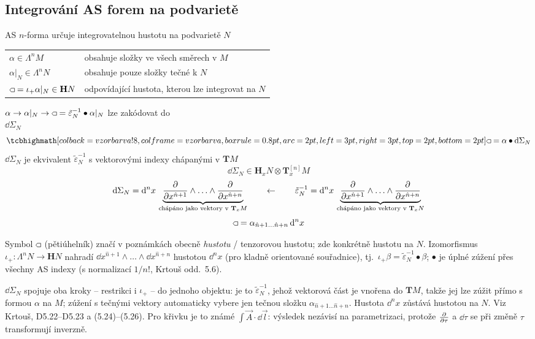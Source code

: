 \subsection{Integrování AS forem na podvarietě}

AS $n$-forma určuje integrovatelnou hustotu na podvarietě $N$

\begin{tabular}{@{}ll}
$\alpha\in\Lambda^nM$ & obsahuje složky ve všech směrech v $M$ \\
$\alpha|_N\in\Lambda^nN$ & obsahuje pouze složky tečné k $N$ \\
$\gmIpatnactHust = \iota_+\alpha|_N\in\mathbf{H}N$ & odpovídající hustota, kterou lze integrovat na $N$
\end{tabular}

\quad $\alpha\to\alpha|_N\to\gmIpatnactHust = \tilde\varepsilon_N^{-1}\bullet\alpha|_N$ \quad
lze zakódovat do \\
\hspace*{5.6cm}  $\dd\Sigma_N$
\[
  \vzorec{\gmIpatnactHust = \alpha\bullet\dd\Sigma_N}
\]
\quad $\dd\Sigma_N$ je ekvivalent $\tilde\varepsilon_N^{-1}$ s vektorovými indexy chápanými v $\mathbf{T}M$
\[
  \dd\Sigma_N\in\mathbf{H}_xN\otimes\mathbf{T}^{[n]}_xM
\]
\[
  \dd\Sigma_N = \dd^n x\,\underbrace{\pdv{x^{\hat n+1}}\wedge\ldots\wedge\pdv{x^{\hat n+n}}}_{\text{chápáno jako vektory v }\mathbf{T}_xM}
  \qquad\leftarrow\qquad
  \tilde\varepsilon_N^{-1} = \dd^n x\,\underbrace{\pdv{x^{\hat n+1}}\wedge\ldots\wedge\pdv{x^{\hat n+n}}}_{\text{chápáno jako vektory v }\mathbf{T}_xN}
\]
\[
  \gmIpatnactHust = \alpha_{\hat n+1\ldots\hat n+n}\,\dd^n x
\]

\begin{vysvetleni}
Symbol $\gmIpatnactHust$ (pětiúhelník) značí v poznámkách obecně \emph{hustotu} / tenzorovou hustotu; zde konkrétně hustotu na $N$. Izomorfismus $\iota_+:\Lambda^nN\to\mathbf HN$ nahradí $\dd x^{\hat n+1}\wedge\ldots\wedge\dd x^{\hat n+n}$ hustotou $\dd^nx$ (pro kladně orientované souřadnice), tj.\ $\iota_+\beta=\tilde\varepsilon_N^{-1}\bullet\beta$; $\bullet$ je úplné zúžení přes všechny AS indexy (s normalizací $1/n!$, Krtouš odd.~5.6).

$\dd\Sigma_N$ spojuje oba kroky -- restrikci i $\iota_+$ -- do jednoho objektu: je to $\tilde\varepsilon_N^{-1}$, jehož vektorová část je vnořena do $\mathbf T M$, takže jej lze zúžit přímo s formou $\alpha$ na $M$; zúžení s tečnými vektory automaticky vybere jen tečnou složku $\alpha_{\hat n+1\ldots\hat n+n}$. Hustota $\dd^nx$ zůstává hustotou na $N$. Viz Krtouš, D5.22--D5.23 a (5.24)--(5.26). Pro křivku je to známé $\int\vec A\cdot\dd\vec l$: výsledek nezávisí na parametrizaci, protože $\pdv{\tau}$ a $\dd\tau$ se při změně $\tau$ transformují inverzně.
\end{vysvetleni}

